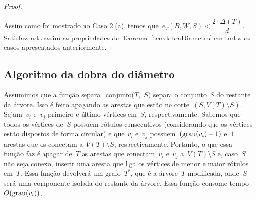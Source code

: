 \begin{proof}
\begin{center}
 \end{center}
	Assim como foi mostrado no Caso 2.(a), temos 
	que~${e_T(B,W,S)<\dfrac{2\cdot \Delta(T)}{d}}$.
	Satisfazendo assim as propriedades do Teorema~\ref{teo:dobraDiametro} em todos os casos apresentados anteriormente.

\end{proof}
	


	\bigskip
	\bigskip
	\bigskip

	\subsection{Algoritmo da dobra do diâmetro}

		Assumimos que a função {\sc separa\_conjunto}$(T,$ $S)$
		separa o conjunto~$S$ do restante da árvore.
		Isso é feito apagando as arestas que estão no 
		corte~$(S,V(T)\setminus S)$.
		Sejam~$v_i$ e~$v_j$ primeiro e último vértices em~$S$, respectivamente.
		Sabemos que todos os vértices de~$S$ possuem
		rótulos consecutivos 
		(considerando que os vértices estão dispostos de forma circular)
		e que~$v_i$ e~$v_j$ possuem~${(\mathrm{grau}(v_i)-1)}$
		e~$1$ arestas que os conectam a~$V(T)\setminus S$, respectivamente.
		Portanto, o que essa função faz é apagar de~$T$ as arestas que 
		conectam~$v_i$ e~$v_j$ a~$V(T)\setminus S$ e, caso~$S$ não seja
		conexo, inserir uma aresta que liga os vértices de menor e maior rótulos em~$T$.
		Essa função devolverá um grafo~$T^*$, que é a árvore~$T$ modificada,
		onde~$S$ será uma componente
		isolada do restante da árvore. 
		Essa função consome tempo~$O(\mathrm{grau}(v_i))$.


